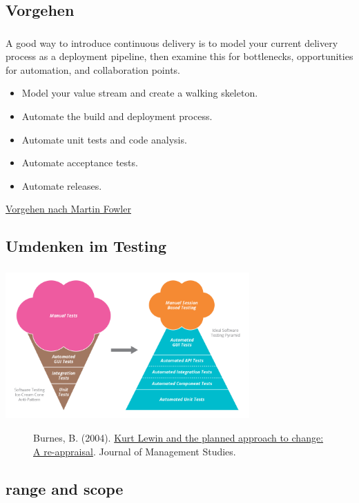 \documentclass[aspectratio=169]{beamer}
\begin{document}
\subsection{Vorgehen}
\begin{frame}
\frametitle{\secname}\framesubtitle{\subsecname}
A good way to introduce continuous delivery is to model your current delivery process as a deployment pipeline, then examine this for bottlenecks, opportunities for automation, and collaboration points.
\begin{itemize}[label={$\bullet$}]
\item Model your value stream and create a walking skeleton.
\item Automate the build and deployment process.
\item Automate unit tests and code analysis.
\item Automate acceptance tests.
\item Automate releases.
\end{itemize}

\href{http://www.informit.com/articles/article.aspx?p=1621865&seqNum=8}{Vorgehen nach Martin Fowler}
\end{frame}

\subsection{Umdenken im Testing}
\begin{frame}
\frametitle{\subsecname}\framesubtitle{\secname}
\centering
\includegraphics[width=0.7\textwidth]{pictures/TestPyramid.png}
\vfill
\begin{figure}[!b]
  Burnes, B. (2004). \href{http://doi.org/10.1111/j.1467-6486.2004.00463.x}{Kurt Lewin and the planned approach to change: A re-appraisal}. Journal of Management Studies.
\end{figure}
\end{frame}


\subsection{range and scope}
\begin{frame}
\frametitle{\subsecname}\framesubtitle{\secname}
\centering
{}

\end{frame}
\end{document}
